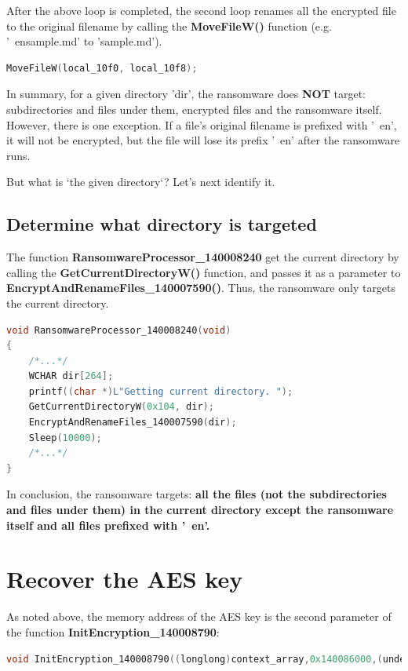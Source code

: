 \documentclass[11pt]{article}
\begin{document}
After the above loop is completed, the second loop renames all the encrypted file to the original filename by calling the \textbf{MoveFileW()} function (e.g. '~ensample.md' to 'sample.md').
  \begin{lstlisting}[language=c++]
    MoveFileW(local_10f0, local_10f8);
\end{lstlisting}

In summary, for a given directory 'dir', the ransomware does \textbf{NOT} target: subdirectories and files under them, encrypted files and the ransomware itself. However, there is one exception. If a file's original filename is prefixed with '~en', it will not be encrypted, but the file will lose its prefix '~en' after the ransomware runs.

But what is `the given directory`? Let's next identify it.

\subsection{Determine what directory is targeted}
The function \textbf{RansomwareProcessor\_140008240} get the current directory by calling the \textbf{GetCurrentDirectoryW()} function, and passes it as a parameter to \textbf{EncryptAndRenameFiles\_140007590()}. Thus, the ransomware only targets the current directory.
\begin{lstlisting}[language=c++, caption=Part of RansomwareProcessor\_140008240]
void RansomwareProcessor_140008240(void)
{
    /*...*/
    WCHAR dir[264];
    printf((char *)L"Getting current directory. ");
    GetCurrentDirectoryW(0x104, dir);
    EncryptAndRenameFiles_140007590(dir);
    Sleep(10000);
    /*...*/
}
\end{lstlisting}

In conclusion, the ransomware targets: \textbf{all the files (not the subdirectories and files under them) in the current directory except the ransomware itself and all files prefixed with '~en'.}


\section{Recover the AES key}
As noted above, the memory address of the AES key is the second parameter of the function \textbf{InitEncryption\_140008790}:
\begin{lstlisting}[language=c++]
void InitEncryption_140008790((longlong)context_array,0x140086000,(undefined8 *)IV_140086010);                           /*Address of the AES key*/
\end{lstlisting}
\end{document}
